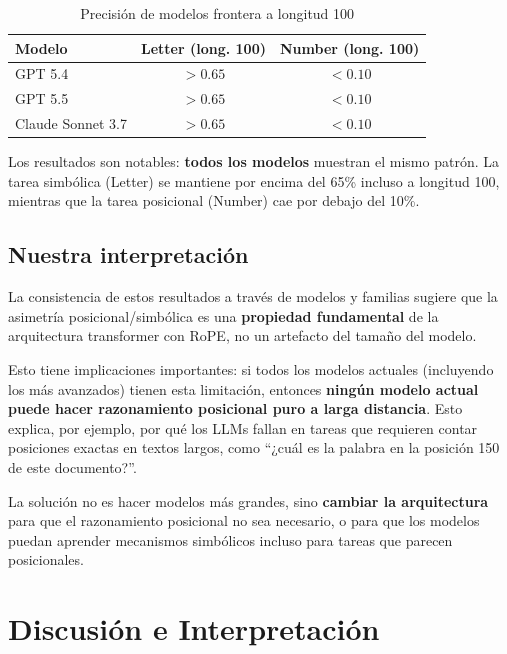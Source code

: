 \documentclass[12pt,a4paper,oneside]{report}
\begin{document}
\begin{table}[h]
\centering
\caption{Precisión de modelos frontera a longitud 100}
\begin{tabular}{lcc}
\toprule
\textbf{Modelo} & \textbf{Letter (long. 100)} & \textbf{Number (long. 100)} \\
\midrule
GPT 5.4     & $>0.65$ & $<0.10$ \\
GPT 5.5     & $>0.65$ & $<0.10$ \\
Claude Sonnet 3.7 & $>0.65$ & $<0.10$ \\
\bottomrule
\end{tabular}
\end{table}

Los resultados son notables: \textbf{todos los modelos} muestran el mismo patrón. La tarea simbólica (Letter) se mantiene por encima del 65\% incluso a longitud 100, mientras que la tarea posicional (Number) cae por debajo del 10\%.

\section{Nuestra interpretación}

La consistencia de estos resultados a través de modelos y familias sugiere que la asimetría posicional/simbólica es una \textbf{propiedad fundamental} de la arquitectura transformer con RoPE, no un artefacto del tamaño del modelo.

Esto tiene implicaciones importantes: si todos los modelos actuales (incluyendo los más avanzados) tienen esta limitación, entonces \textbf{ningún modelo actual puede hacer razonamiento posicional puro a larga distancia}. Esto explica, por ejemplo, por qué los LLMs fallan en tareas que requieren contar posiciones exactas en textos largos, como ``¿cuál es la palabra en la posición 150 de este documento?''.

La solución no es hacer modelos más grandes, sino \textbf{cambiar la arquitectura} para que el razonamiento posicional no sea necesario, o para que los modelos puedan aprender mecanismos simbólicos incluso para tareas que parecen posicionales.

\chapter{Discusión e Interpretación}
\end{document}
